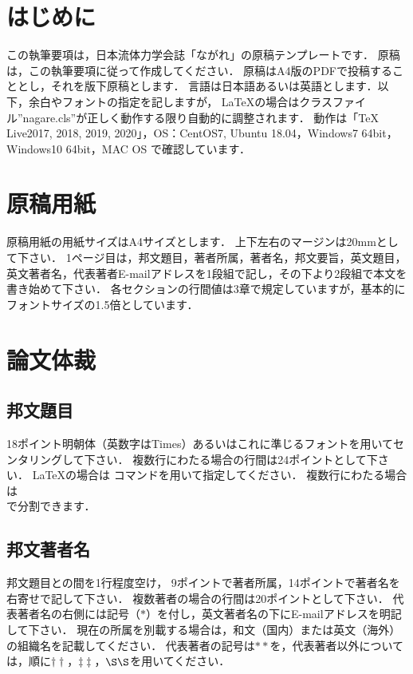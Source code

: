 \documentclass[main]{subfiles}
\begin{document}
    \section{はじめに}
    この執筆要項は，日本流体力学会誌「ながれ」の原稿テンプレートです．
    原稿は，この執筆要項に従って作成してください．
    原稿はA4版のPDFで投稿することとし，それを版下原稿とします．
    言語は日本語あるいは英語とします．以下，余白やフォントの指定を記しますが，
    {\LaTeX}の場合はクラスファイル”nagare.cls”が正しく動作する限り自動的に調整されます．
    動作は「TeX Live2017, 2018, 2019, 2020」，OS：CentOS7, Ubuntu 18.04，Windows7 64bit，Windows10 64bit，MAC OS で確認しています．
    
    \section{原稿用紙}
    原稿用紙の用紙サイズはA4サイズとします．
    上下左右のマージンは20mmとして下さい．
    1ページ目は，邦文題目，著者所属，著者名，邦文要旨，英文題目，英文著者名，代表著者E-mailアドレスを1段組で記し，その下より2段組で本文を書き始めて下さい．
    各セクションの行間値は3章で規定していますが，基本的にフォントサイズの1.5倍としています．
    
    \section{論文体裁}   

    \subsection{邦文題目}   
        18ポイント明朝体（英数字はTimes）あるいはこれに準じるフォントを用いてセンタリングして下さい．
        複数行にわたる場合の行間は24ポイントとして下さい．
        LaTeXの場合は \jtitle コマンドを用いて指定してください．
        複数行にわたる場合は \\ で分割できます．
    
    \subsection{邦文著者名}    
        邦文題目との間を1行程度空け，
        9ポイントで著者所属，14ポイントで著者名を右寄せで記して下さい．
        複数著者の場合の行間は20ポイントとして下さい．
        代表著者名の右側には記号（$\ast$）を付し，英文著者名の下にE-mailアドレスを明記して下さい．
        現在の所属を別載する場合は，和文（国内）または英文（海外）の組織名を記載してください．
        代表著者の記号は${**}$を，代表著者以外については，順に${\dagger\dagger}$，${\ddagger\ddagger}$，${\S\S}$を用いてください．
    
\end{document}
